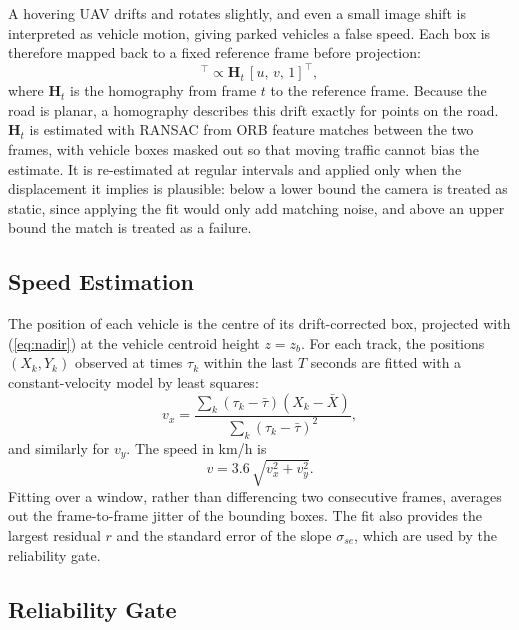\documentclass[conference]{IEEEtran}
\begin{document}
A hovering UAV drifts and rotates slightly, and even a small image shift is interpreted as vehicle motion, giving parked vehicles a false speed. Each box is therefore mapped back to a fixed reference frame before projection:
\begin{equation}
[\tilde{u},\,\tilde{v},\,1]^{\top} \propto \mathbf{H}_t\,[u,\,v,\,1]^{\top},
\end{equation}
where $\mathbf{H}_t$ is the homography from frame $t$ to the reference frame. Because the road is planar, a homography describes this drift exactly for points on the road. $\mathbf{H}_t$ is estimated with RANSAC from ORB feature matches between the two frames, with vehicle boxes masked out so that moving traffic cannot bias the estimate. It is re-estimated at regular intervals and applied only when the displacement it implies is plausible: below a lower bound the camera is treated as static, since applying the fit would only add matching noise, and above an upper bound the match is treated as a failure.

\subsection{Speed Estimation}

The position of each vehicle is the centre of its drift-corrected box, projected with (\ref{eq:nadir}) at the vehicle centroid height $z = z_b$. For each track, the positions $(X_k, Y_k)$ observed at times $\tau_k$ within the last $T$ seconds are fitted with a constant-velocity model by least squares:
\begin{equation}
v_x = \frac{\sum_k (\tau_k-\bar{\tau})(X_k-\bar{X})}{\sum_k (\tau_k-\bar{\tau})^2},
\end{equation}
and similarly for $v_y$. The speed in km/h is
\begin{equation}
v = 3.6\,\sqrt{v_x^2 + v_y^2}.
\end{equation}
Fitting over a window, rather than differencing two consecutive frames, averages out the frame-to-frame jitter of the bounding boxes. The fit also provides the largest residual $r$ and the standard error of the slope $\sigma_{se}$, which are used by the reliability gate.

\subsection{Reliability Gate}
\end{document}
